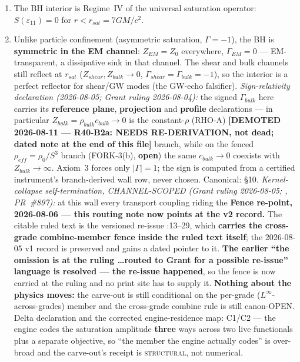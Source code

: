 \begin{enumerate}
    \item The BH interior is Regime~IV of the universal saturation operator:
    $S(\varepsilon_{11}) = 0$ for $r < r_{sat} = 7GM/c^2$.

    \item Unlike particle confinement (asymmetric saturation, $\Gamma = -1$\gammaundeclared{}),
    the BH is \textbf{symmetric in the EM channel}: $Z_{EM} = Z_0$ everywhere,
    $\Gamma_{EM} = 0$ --- EM-transparent, a dissipative sink in that channel.
    The shear and bulk channels still reflect at $r_{sat}$ ($Z_{shear},
    Z_{bulk} \to 0$, $\Gamma_{shear} = \Gamma_{bulk} = -1$), so the interior
    is a perfect reflector for shear/GW modes (the GW-echo falsifier).
    \emph{Sign-relativity declaration (2026-08-05; Grant ruling 2026-08-04):}
    the signed $\Gamma_{bulk}$ here carries its \textbf{reference plane},
    \textbf{projection} and \textbf{profile} declarations --- in particular
    $Z_{bulk} = \rho_{bulk} c_{bulk} \to 0$ is the constant-$\rho$ (RHO-A) \textbf{[DEMOTED 2026-08-11 --- R40-B2a: NEEDS RE-DERIVATION, not dead; dated note at the end of this file]}
    branch, while on the fenced $\rho_{eff} = \rho_0/S^3$ branch (FORK-3(b),
    \textbf{open}) the same $c_{bulk} \to 0$ coexists with
    $Z_{bulk} \to \infty$. Axiom~3 forces only $|\Gamma| = 1$\gammaundeclared{}; the sign is
    computed from a certified instrument's branch-derived wall row, never
    chosen. Canonical:  \S10.
    \emph{Kernel-collapse self-termination, CHANNEL-SCOPED (Grant ruling
    2026-08-05; , PR~\#897):} at this wall every transport coupling riding the \textbf{Fence re-point, 2026-08-06 --- this routing note now points at the v2 record.} The citable ruled text is the versioned re-issue :13--29, which \textbf{carries the cross-grade combine-member fence inside the ruled text itself}; the 2026-08-05 v1 record is preserved and gains a dated pointer to it. \textbf{The earlier ``the omission is at the ruling \ldots routed to Grant for a possible re-issue'' language is resolved --- the re-issue happened}, so the fence is now carried at the ruling and no print site has to supply it. \textbf{Nothing about the physics moves:} the carve-out is still conditional on the per-grade ($L^\infty$-across-grades) member and the cross-grade combine rule is still canon-OPEN. Delta declaration and the corrected engine-residence map:  C1/C2 --- the engine codes the saturation amplitude \textbf{three} ways across two live functionals plus a separate objective, so ``the member the engine actually codes'' is over-broad and the carve-out's receipt is \textsc{structural}, not numerical.

\end{enumerate}
